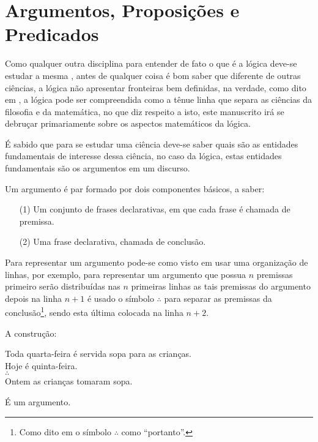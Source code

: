 \section{Argumentos, Proposições e Predicados}\label{sec:LogicsComponents}

Como qualquer outra disciplina para entender de fato o que é a lógica deve-se estudar a mesma \cite{copi1981}, antes de qualquer coisa é bom saber que diferente de outras ciências, a lógica não apresentar fronteiras bem definidas, na verdade, como dito em \cite{joaoPavao2014}, a lógica pode ser compreendida como a tênue linha que separa as ciências da filosofia e da matemática, no que diz respeito a isto, este manuscrito irá se debruçar primariamente sobre os aspectos matemáticos da lógica.

É sabido que para se estudar uma ciência deve-se saber quais são as entidades fundamentais de interesse dessa ciência, no caso da lógica, estas entidades fundamentais são os argumentos em um discurso.

\begin{definicao}[Argumento]\label{def:Argumento}
	Um argumento é par formado por dois componentes básicos, a saber:
	\begin{itemize}
		\item[(1)] Um conjunto de frases declarativas, em que cada frase é chamada de premissa.
		\item[(2)] Uma frase declarativa, chamada de conclusão.
	\end{itemize}
\end{definicao}

Para representar um argumento pode-se como visto em \cite{copi1981, joaoPavao2014} usar uma organização de linhas, por exemplo, para representar um argumento que possua $n$ premissas primeiro serão distribuídas nas $n$ primeiras linhas as tais premissas do argumento depois na linha $n+1$ é usado o símbolo $\wasytherefore$ para separar as premissas da conclusão\footnote{Como dito em \cite{magnus2020} o símbolo $\wasytherefore$ como ``portanto''.}, sendo esta última colocada na linha $n+2$.

\begin{exemplo}\label{exe:Argumento1}
	A construção:
	\begin{center}
		Toda quarta-feira é servida sopa para as crianças.\\
		Hoje é quinta-feira.\\
		$\wasytherefore$\\
		Ontem as crianças tomaram sopa.
	\end{center}
	É um argumento.
\end{exemplo}

